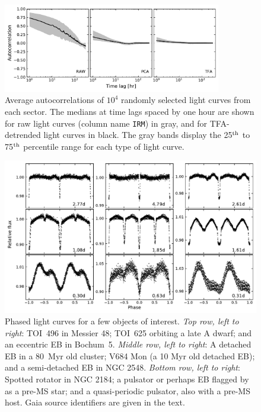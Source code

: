 \documentclass[12pt,twocolumn,tighten]{aastex62}
\begin{document}
\begin{figure}[!t]
	\begin{center}
		\leavevmode
		\includegraphics[width=0.85\textwidth]{avg_acf.pdf}
	\end{center}
	\vspace{-0.7cm}
  \caption{
    Average autocorrelations of $10^4$ randomly selected light curves
    from each sector.  The medians at time lags spaced by one hour are
    shown for raw light curves (column name \texttt{IRM}) in gray, and
    for TFA-detrended light curves in black.  The gray bands display
    the 25$^{\rm th}$ to 75$^{\rm th}$ percentile range for each type
    of light curve.
  \label{fig:avg_acf}
	}
\end{figure}

\begin{figure}[!t]
	\begin{center}
		\leavevmode
		\includegraphics[width=1\textwidth]{quilt_s6_s7.pdf}
	\end{center}
	\vspace{-0.8cm}
	\caption{
		Phased light curves for a few objects of interest.
		{\it Top row, left to right}:
		TOI~496 in Messier 48;
		TOI~625 orbiting a late A dwarf;
		and an eccentric EB in Bochum~5.
		{\it Middle row, left to right}:
		A detached EB in a 80~Myr old cluster;
		V684 Mon (a 10 Myr old detached EB);
		and a semi-detached EB in NGC 2548.
		{\it Bottom row, left to right}:
		Spotted rotator in NGC 2184;
		a pulsator or perhaps EB flagged by \citet{zari_3d_2018} as a pre-MS 
		star;
		and a quasi-periodic pulsator, also with a pre-MS host.
		Gaia source identifiers are given in the text.
	\label{fig:quilt}
	}
\end{figure}
\end{document}
